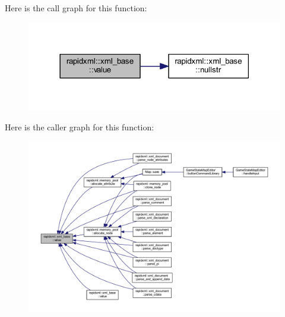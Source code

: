 Here is the call graph for this function\+:
\nopagebreak
\begin{figure}[H]
\begin{center}
\leavevmode
\includegraphics[width=318pt]{classrapidxml_1_1xml__base_adcdaccff61c665f039d9344e447b7445_cgraph}
\end{center}
\end{figure}




Here is the caller graph for this function\+:
\nopagebreak
\begin{figure}[H]
\begin{center}
\leavevmode
\includegraphics[width=350pt]{classrapidxml_1_1xml__base_adcdaccff61c665f039d9344e447b7445_icgraph}
\end{center}
\end{figure}


